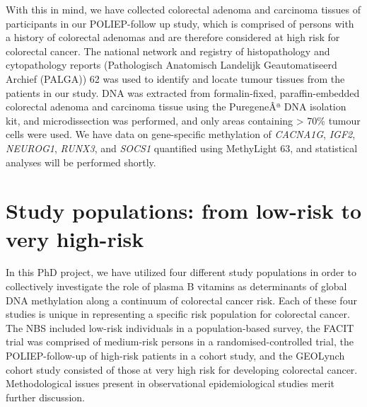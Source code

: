 \noindent With this in mind, we have collected colorectal adenoma and carcinoma tissues of participants in our POLIEP-follow up study, which is comprised of persons with a history of colorectal adenomas and are therefore considered at high risk for colorectal cancer. The national network and registry of histopathology and cytopathology reports (Pathologisch Anatomisch Landelijk Geautomatiseerd Archief (PALGA)) 62 was used to identify and locate tumour tissues from the patients in our study. DNA was extracted from formalin-fixed, paraffin-embedded colorectal adenoma and carcinoma tissue using the PuregeneÂª DNA isolation kit, and microdissection was performed, and only areas containing > 70\% tumour cells were used. We have data on gene-specific methylation of \emph{CACNA1G}, \emph{IGF2}, \emph{NEUROG1}, \emph{RUNX3}, and \emph{SOCS1} quantified using MethyLight 63, and statistical analyses will be performed shortly. 
 
\section[]{Study populations: from low-risk to very high-risk} %
In this PhD project, we have utilized four different study populations in order to collectively investigate the role of plasma B vitamins as determinants of global DNA methylation along a continuum of colorectal cancer risk. Each of these four studies is unique in representing a specific risk population for colorectal cancer. The NBS included low-risk individuals in a population-based survey, the FACIT trial was comprised of medium-risk persons in a randomised-controlled trial, the POLIEP-follow-up of high-risk patients in a cohort study, and the GEOLynch cohort study consisted of those at very high risk for developing colorectal cancer. Methodological issues present in observational epidemiological studies merit further discussion. 
 
